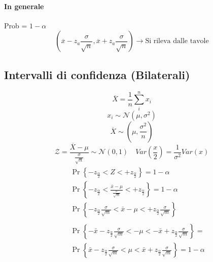 \documentclass[]{article}
\begin{document}
    \paragraph{In generale} Prob = $1-\alpha$
    \[ (\overline{x} - z_a \frac{\sigma}{\sqrt{n}}, \overline{x} + z_a \frac{\sigma}{\sqrt{n}} ) \rightarrow \text{Si rileva dalle tavole} \]
    \subsection{Intervalli di confidenza (Bilaterali)}
    \[ \overline{X} = \frac{1}{n} \sum_{i}^{n} x_i \]
    \[ x_i \sim \mathcal{N}(\mu, \sigma^2) \]
    \[ \overline{X} \sim(\mu, \frac{\sigma^2}{n}) \]
    \[ \mathcal{Z} = \frac{\overline{X} - \mu}{\frac{\sigma}{\sqrt{n}}} \sim \mathcal{N}(0, 1) \quad Var(\frac{x}{2}) = \frac{1}{\sigma^2} Var(x) \]
    \begin{equation*}
        \begin{aligned}
            &\begin{aligned}
            & \operatorname{Pr}\left\{-z_{\frac{\alpha}{2}}<Z<+z_{\frac{\alpha}{2}}\right\}=1-\alpha \\
            & \operatorname{Pr}\left\{-z_{\frac{\alpha}{2}}<\frac{\bar{x}-\mu}{\frac{\sigma}{\sqrt{m}}}<+z_{\frac{\alpha}{2}}\right\}=1-\alpha \\
                & \operatorname{Pr}\left\{-z_{\frac{\alpha}{2}} \frac{\sigma}{\sqrt{m}}<\bar{x}-\mu<+z_{\frac{\alpha}{2}} \frac{\sigma}{\sqrt{m}}\right\}
        \end{aligned}\\
        &\begin{aligned}
        & \operatorname{Pr}\left\{-\bar{x}-z_{\frac{\alpha}{2}} \frac{\sigma}{\sqrt{m}}<-\mu<-\bar{x}+z_{\frac{\alpha}{2}} \frac{\sigma}{\sqrt{m}}\right\}= \\
        & \operatorname{Pr}\left\{\bar{x}-z_{\frac{\alpha}{2}} \frac{\sigma}{\sqrt{m}}<\mu<\bar{x}+z_{\frac{\alpha}{2}} \frac{\sigma}{\sqrt{m}}\right\}=1-\alpha
        \end{aligned}
        \end{aligned}
    \end{equation*}
\end{document}
